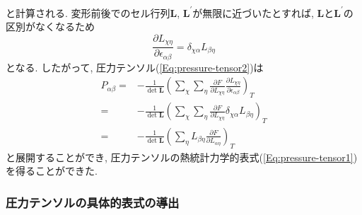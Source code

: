 と計算される.
変形前後でのセル行列$\bm{L}$, $\bm{L}^{\prime}$が無限に近づいたとすれば,
$\bm{L}$と$\bm{L}^{\prime}$の区別がなくなるため
\begin{equation}
  \frac{\partial L_{\chi\eta}}{\partial \epsilon_{\alpha\beta}}
  =
  \delta_{\chi\alpha} L_{\beta\eta}
\end{equation}
となる.
したがって, 圧力テンソル(\ref{Eq:pressure-tensor2})は
\begin{align}
  P_{\alpha \beta}
  =&
  - \frac{1}{\det \bm{L}}
  \left(
    \sum_{\chi} \sum_{\eta}
    \frac{\partial F}{\partial L_{\chi \eta}}
    \frac{\partial L_{\chi \eta}}{\partial \epsilon_{\alpha \beta}}
  \right)_{T}
  \\
  =&
  - \frac{1}{\det \bm{L}}
  \left(
    \sum_{\chi} \sum_{\eta}
    \frac{\partial F}{\partial L_{\chi \eta}}
    \delta_{\chi\alpha} L_{\beta\eta}
  \right)_{T}
  \\
  =&
  - \frac{1}{\det \bm{L}}
  \left(
    \sum_{\eta} L_{\beta\eta}
    \frac{\partial F}{\partial L_{\alpha \eta}}
  \right)_{T}
\end{align}
と展開することができ, 圧力テンソルの熱統計力学的表式(\ref{Eq:pressure-tensor1})を得ることができた. 

\subsubsection{圧力テンソルの具体的表式の導出}

